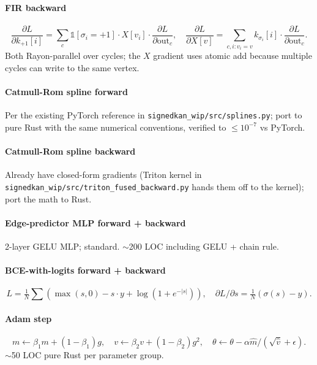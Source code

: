 \documentclass[10pt]{article}
\begin{document}
\paragraph{FIR backward}
\[
  \frac{\partial L}{\partial k_{+1}[i]} = \sum_{c} \mathbb{1}[\sigma_i = +1]
    \cdot X[v_i] \cdot \frac{\partial L}{\partial \mathrm{out}_c},
  \quad
  \frac{\partial L}{\partial X[v]} = \sum_{c, i: v_i = v}
    k_{\sigma_i}[i] \cdot \frac{\partial L}{\partial \mathrm{out}_c}.
\]
Both Rayon-parallel over cycles; the $X$ gradient uses atomic add
because multiple cycles can write to the same vertex.

\paragraph{Catmull-Rom spline forward}
Per the existing PyTorch reference in \texttt{signedkan\_wip/src/splines.py};
port to pure Rust with the same numerical conventions, verified to
$\le 10^{-7}$ vs PyTorch.

\paragraph{Catmull-Rom spline backward}
Already have closed-form gradients (Triton kernel in
\texttt{signedkan\_wip/src/triton\_fused\_backward.py} hands them off
to the kernel); port the math to Rust.

\paragraph{Edge-predictor MLP forward + backward}
2-layer GELU MLP; standard. $\sim$200 LOC including GELU + chain rule.

\paragraph{BCE-with-logits forward + backward}
\[
  L = \tfrac{1}{N}\sum (\max(s, 0) - s \cdot y + \log(1 + e^{-|s|})),
  \quad
  \partial L / \partial s = \tfrac{1}{N}(\sigma(s) - y).
\]

\paragraph{Adam step}
\[
  m \leftarrow \beta_1 m + (1-\beta_1) g, \quad
  v \leftarrow \beta_2 v + (1-\beta_2) g^2, \quad
  \theta \leftarrow \theta - \alpha \hat m / (\sqrt{\hat v} + \epsilon).
\]
$\sim$50 LOC pure Rust per parameter group.
\end{document}
